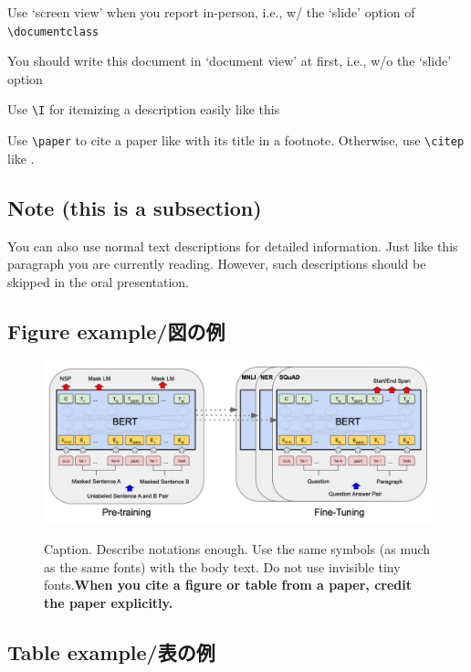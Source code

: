 \documentclass[]{lrlabreport}
\begin{document}
\I Use `screen view' when you report in-person, i.e., w/ the `slide' option of \verb|\documentclass|

\I You should write this document in `document view' at first, i.e., w/o the `slide' option


\I Use \verb|\I| for itemizing a description easily like this

\I Use \verb|\paper| to cite a paper like  with its title in a footnote. Otherwise, use \verb|\citep| like \citep{nakaneNLP2025}.

\subsection{Note (this is a subsection)}
{\small \redcolor You can also use normal text descriptions for detailed information. Just like this paragraph you are currently reading. However, such descriptions should be skipped in the oral presentation.} 

\subsection{Figure example/図の例}

\begin{figure}[H] %
    \centering
    \includegraphics[width=.9\linewidth]{bert_aclanth_N19-1423_fig-1.pdf}
    \\{\tiny \cite[Figure 1]{devlin-etal-2019-bert}}
    \caption{\footnotesize Caption. Describe notations enough. Use the same symbols (as much as the same fonts) with the body text. Do not use invisible tiny fonts.\bf When you cite a figure or table from a paper, credit the paper explicitly.}
    \label{fig:architecture}
\end{figure}

\subsection{Table example/表の例}
\end{document}
